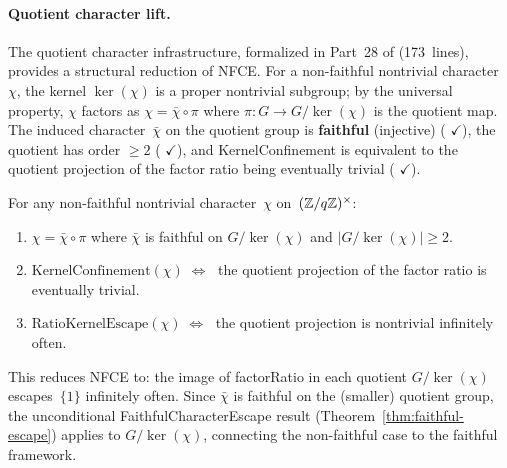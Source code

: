 \paragraph{Quotient character lift.}
The quotient character infrastructure, formalized in Part~28 of
 (173~lines),
provides a structural reduction of NFCE\@.
For a non-faithful nontrivial character~$\chi$, the kernel
$\ker(\chi)$ is a proper nontrivial subgroup; by the universal
property, $\chi$ factors as
$\chi = \bar\chi \circ \pi$
where $\pi \colon G \to G/\ker(\chi)$ is the quotient map.
The induced character~$\bar\chi$ on the quotient group is
\textbf{faithful} (injective)
(
{\color{leanink}$\checkmark$}),
the quotient has order $\geq 2$
(
{\color{leanink}$\checkmark$}),
and KernelConfinement is equivalent to the quotient projection
of the factor ratio being eventually trivial
(
{\color{leanink}$\checkmark$}).
\begin{theorem}
\label{thm:quotient-lift}
For any non-faithful nontrivial character~$\chi$ on~$(\mathbb{Z}/q\mathbb{Z})^\times$:
\begin{enumerate}[nosep]
\item $\chi = \bar\chi \circ \pi$ where $\bar\chi$ is faithful
  on $G/\ker(\chi)$ and $|G/\ker(\chi)| \geq 2$.
\item $\mathrm{KernelConfinement}(\chi) \;\Longleftrightarrow\;$
  the quotient projection of the factor ratio is eventually trivial.
\item $\mathrm{RatioKernelEscape}(\chi) \;\Longleftrightarrow\;$
  the quotient projection is nontrivial infinitely often.
\end{enumerate}
\end{theorem}

\noindent This reduces NFCE to: the image of factorRatio in each quotient
$G/\ker(\chi)$ escapes~$\{1\}$ infinitely often.
Since $\bar\chi$ is faithful on the (smaller) quotient group, the
unconditional FaithfulCharacterEscape result
(Theorem~\ref{thm:faithful-escape}) applies to $G/\ker(\chi)$,
connecting the non-faithful case to the faithful framework.

